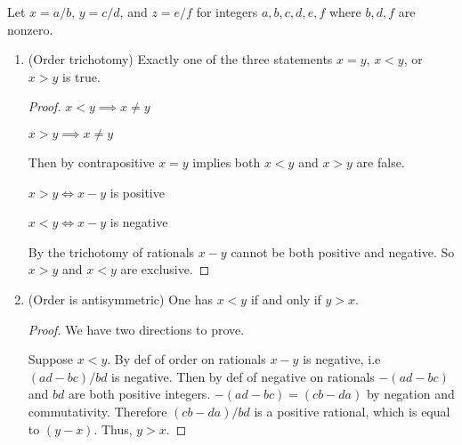 \documentclass[../../main.tex]{subfiles}
\begin{document}
Let $x = a/b$, $y = c/d$, and $z = e/f$ for integers $a, b, c, d, e, f$ where $b, d, f$ are nonzero.
\begin{enumerate}
    \item
    \begin{q}
         (Order trichotomy) Exactly one of the three statements $x = y$, $x < y$, or $x > y$ is true.
    \end{q}
    \begin{proof}
        $x < y \implies x \neq y$

        $x > y \implies x \neq y$

        Then by contrapositive $x = y$ implies both $x < y$ and $x > y$ are false.

        $x > y \iff x-y$ is positive

        $x < y \iff x-y$ is negative

        By the trichotomy of rationals $x-y$ cannot be both positive and negative. So $x > y$ and $x < y$ are exclusive.
    \end{proof}
    \item 
    \begin{q}
        (Order is antisymmetric) One has $x < y$ if and only if $y > x$.
    \end{q}
    \begin{proof}
        We have two directions to prove.

        Suppose $x < y$. 
        By def of order on rationals $x-y$ is negative, i.e 
        $(ad - bc) / bd$ is negative.
        Then by def of negative on rationals $-(ad - bc)$ and $bd$ are both positive integers.
        $-(ad - bc) = (cb - da)$ by negation and commutativity.
        Therefore $(cb - da) / bd$ is a positive rational, which is equal to $(y-x)$.
        Thus, $y > x$.


\end{proof}
\end{enumerate}
\end{document}
